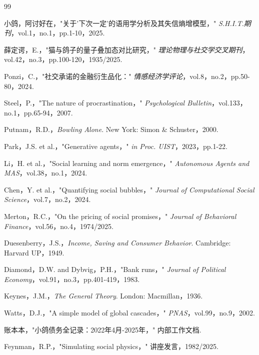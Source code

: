 \documentclass[journal]{IEEEtran}
\begin{document}
\begin{thebibliography}{99}

 小鸽，阿讨好在，"关于'下次一定'的语用学分析及其失信熵增模型，" \textit{S.H.I.T.期刊}，vol.1，no.1，pp.1-10，2025.

 薛定谔，E.，"猫与鸽子的量子叠加态对比研究，" \textit{理论物理与社交学交叉期刊}，vol.42，no.3，pp.100-120，1935/2025.

 Ponzi，C.，"社交承诺的金融衍生品化：" \textit{情感经济学评论}，vol.8，no.2，pp.50-80，2024.

 Steel，P.，"The nature of procrastination，" \textit{Psychological Bulletin}，vol.133，no.1，pp.65-94，2007.

 Putnam，R.D.，\textit{Bowling Alone}. New York: Simon \& Schuster，2000.

 Park，J.S. et al.，"Generative agents，" \textit{in Proc. UIST}，2023，pp.1-22.

 Li，H. et al.，"Social learning and norm emergence，" \textit{Autonomous Agents and MAS}，vol.38，no.1，2024.

 Chen，Y. et al.，"Quantifying social bubbles，" \textit{Journal of Computational Social Science}，vol.7，no.2，2024.

 Merton，R.C.，"On the pricing of social promises，" \textit{Journal of Behavioral Finance}，vol.56，no.4，1974/2025.

 Duesenberry，J.S.，\textit{Income, Saving and Consumer Behavior}. Cambridge: Harvard UP，1949.

 Diamond，D.W. and Dybvig，P.H.，"Bank runs，" \textit{Journal of Political Economy}，vol.91，no.3，pp.401-419，1983.

 Keynes，J.M.，\textit{The General Theory}. London: Macmillan，1936.

 Watts，D.J.，"A simple model of global cascades，" \textit{PNAS}，vol.99，no.9，2002.

 账本本，"小鸽债务全记录：2022年4月-2025年，" 内部工作文档.

 Feynman，R.P.，"Simulating social physics，" 讲座发言，1982/2025.


\end{thebibliography}
\end{document}

